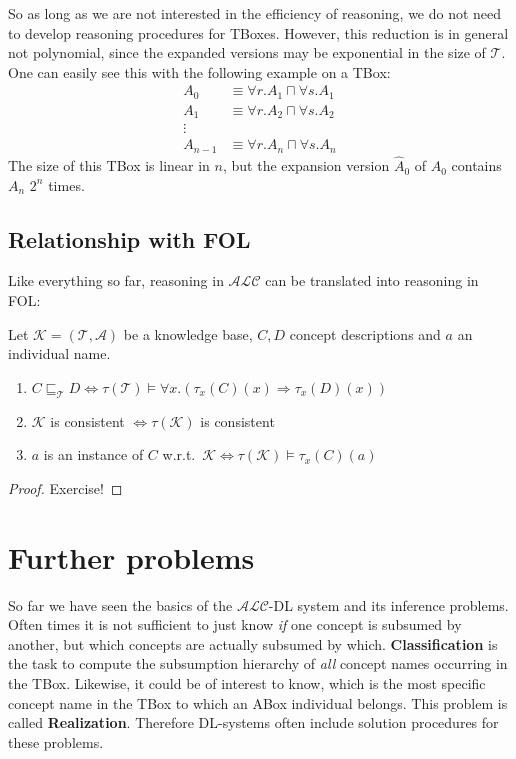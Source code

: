 So as long as we are not interested in the efficiency of reasoning, we do not need to develop reasoning procedures for TBoxes.
However, this reduction is in general not polynomial, since the expanded versions may be exponential in the size of $\mathcal{T}$.
One can easily see this with the following example on a TBox:
\begin{align*}
	A_0 &\equiv \forall r.A_1 \sqcap \forall s. A_1 \\
	A_1 &\equiv \forall r.A_2 \sqcap \forall s.A_2 \\
	\vdots & \\
	A_{n-1} & \equiv \forall r.A_n \sqcap \forall s.A_{n}
\end{align*}
The size of this TBox is linear in $n$,
but the expansion version $\widehat{A}_0$ of $A_0$ contains $A_n$ $2^n$ times.

\subsection{Relationship with FOL}
Like everything so far, reasoning in $\mathcal{ALC}$ can be translated into reasoning in FOL:
\begin{lemma}
	Let $\mathcal{K} = ( \mathcal{T},\mathcal{A})$ be a knowledge base, $C,D$ concept descriptions and $a$ an individual name.
	\begin{enumerate}
		\item $C \sqsubseteq_{\mathcal{T}} D \iff \tau(\mathcal{T}) \vDash \forall x.(\tau_x(C)(x) \Rightarrow \tau_x(D)(x))$
		\item $ \mathcal{K}$ is consistent $ \iff \tau(\mathcal{K})$ is consistent
		\item $a$ is an instance of $C$ w.r.t.\ $\mathcal{K} \iff \tau \left( \mathcal{K} \right) \vDash \tau_x(C)(a)$
	\end{enumerate}
\end{lemma}

\begin{proof}
	Exercise!	
\end{proof}

\newpage
\section{Further problems}
So far we have seen the basics of the $\mathcal{ALC}$-DL system and its inference problems.
Often times it is not sufficient to just know \textit{if} one concept is subsumed by another,
but which concepts are actually subsumed by which.
\textbf{Classification} is the task to compute the subsumption hierarchy of \textit{all} concept names occurring in the TBox.
\newline
Likewise, it could be of interest to know, which is the most specific concept name in the TBox to which an ABox individual belongs.
This problem is called \textbf{Realization}.
\newline
Therefore DL-systems often include solution procedures for these problems.

